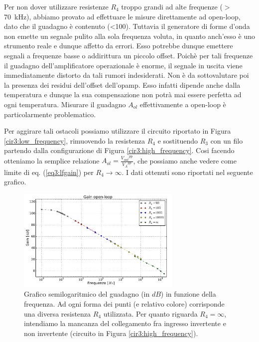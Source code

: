 Per non dover utilizzare resistenze $R_4$ troppo grandi ad alte frequenze ($>$ \SI{70}{\kilo\hertz}), abbiamo provato ad effettuare le misure direttamente ad open-loop, dato che il guadagno è contenuto (\num{<100}).
Tuttavia il generatore di forme d'onda non emette un segnale pulito alla sola frequenza voluta, in quanto anch'esso è uno strumento reale e dunque affetto da errori.
Esso potrebbe dunque emettere segnali a frequenze basse o addirittura un piccolo offset.
Poichè per tali frequenze il guadagno dell'amplificatore operazionale è enorme, il segnale in uscita viene immediatamente distorto da tali rumori indesiderati.
Non è da sottovalutare poi la presenza dei residui dell'offset dell'opamp.
Esso infatti dipende anche dalla temperatura e dunque la sua compensazione non potrà mai essere perfetta ad ogni temperatura.
Misurare il guadagno $A_{ol}$ effettivamente a open-loop è particolarmente problematico.

Per aggirare tali ostacoli possiamo utilizzare il circuito riportato in Figura \ref{cir3:low_frequency}, rimuovendo la resistenza $R_4$ e sostituendo $R_3$ con un filo partendo dalla configurazione di Figura \ref{cir3:high_frequency}.
Cosi facendo otteniamo la semplice relazione $A_{ol}=\frac{{V_{out}}^{pp}}{{V_A}^{pp}}$, che possiamo anche vedere come limite di eq. (\ref{eq3:lfgain}) per $R_4 \rightarrow \infty$.
I dati ottenuti sono riportati nel seguente grafico. 

\begin{figure}[h]
	\centering
	\includegraphics[width=0.7\textwidth]{../E03/latex/gol.pdf}
	\caption{Grafico semilogaritmico del guadagno (in $dB$) in funzione della frequenza. Ad ogni forma dei punti (e relativo colore) corrisponde una diversa resistenza $R_4$ utilizzata. Per quanto riguarda $R_4=\infty$, intendiamo la mancanza del collegamento fra ingresso invertente e non invertente (circuito in Figura \ref{cir3:high_frequency}).}
  \label{cir3:gain_open_loop}
\end{figure}


